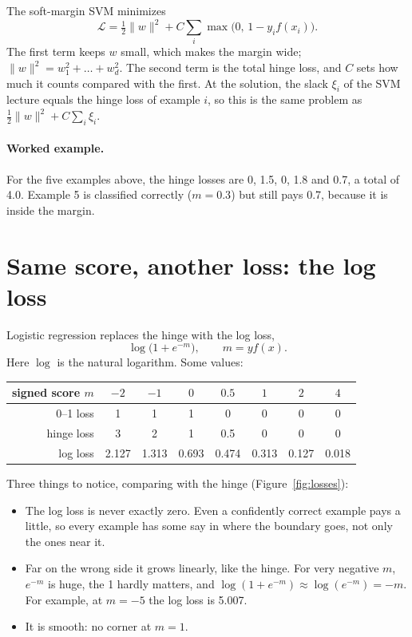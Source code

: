 \documentclass[11pt]{article}
\newcommand{\Loss}{\mathcal{L}}
\begin{document}
The soft-margin SVM minimizes
\[
  \Loss = \tfrac12 \|w\|^2 + C \sum_i \max\bigl(0,\, 1 - y_i f(x_i)\bigr).
\]
The first term keeps $w$ small, which makes the margin wide; $\|w\|^2 = w_1^2 + \dots + w_d^2$. The
second term is the total hinge loss, and $C$ sets how much it counts compared with the first. At the
solution, the slack $\xi_i$ of the SVM lecture equals the hinge loss of example $i$, so this is the
same problem as $\tfrac12 \|w\|^2 + C \sum_i \xi_i$.

\paragraph{Worked example.} For the five examples above, the hinge losses are 0, 1.5, 0, 1.8 and 0.7,
a total of 4.0. Example 5 is classified correctly ($m = 0.3$) but still pays 0.7, because it is inside
the margin.

\section{Same score, another loss: the log loss}\label{sec:log}

Logistic regression replaces the hinge with the log loss,
\[
  \log\bigl(1 + e^{-m}\bigr), \qquad m = y f(x).
\]
Here $\log$ is the natural logarithm. Some values:

\begin{center}
\begin{tabular}{rccccccc}
  \toprule
  signed score $m$ & $-2$ & $-1$ & $0$ & $0.5$ & $1$ & $2$ & $4$ \\
  \midrule
  0--1 loss      & 1     & 1     & 1     & 0     & 0     & 0     & 0 \\
  hinge loss     & 3     & 2     & 1     & 0.5   & 0     & 0     & 0 \\
  log loss       & 2.127 & 1.313 & 0.693 & 0.474 & 0.313 & 0.127 & 0.018 \\
  \bottomrule
\end{tabular}
\end{center}


Three things to notice, comparing with the hinge (Figure~\ref{fig:losses}):
\begin{itemize}
  \item The log loss is never exactly zero. Even a confidently correct example pays a little, so every
        example has some say in where the boundary goes, not only the ones near it.
  \item Far on the wrong side it grows linearly, like the hinge. For very negative $m$, $e^{-m}$ is
        huge, the 1 hardly matters, and $\log(1 + e^{-m}) \approx \log(e^{-m}) = -m$. For example, at
        $m = -5$ the log loss is 5.007.
  \item It is smooth: no corner at $m = 1$.
\end{itemize}
\end{document}
